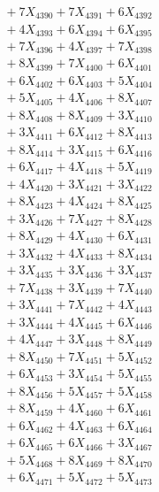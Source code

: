\documentclass[a4paper,10pt]{article}
\begin{document}
{\begin{align}
&\;  + 7 X_{4390} + 7 X_{4391} + 6 X_{4392} \\[0.3ex]
&\;  + 4 X_{4393} + 6 X_{4394} + 6 X_{4395} \\[0.3ex]
&\;  + 7 X_{4396} + 4 X_{4397} + 7 X_{4398} \\[0.3ex]
&\;  + 8 X_{4399} + 7 X_{4400} + 6 X_{4401} \\[0.3ex]
&\;  + 6 X_{4402} + 6 X_{4403} + 5 X_{4404} \\[0.3ex]
&\;  + 5 X_{4405} + 4 X_{4406} + 8 X_{4407} \\[0.3ex]
&\;  + 8 X_{4408} + 8 X_{4409} + 3 X_{4410} \\[0.3ex]
&\;  + 3 X_{4411} + 6 X_{4412} + 8 X_{4413} \\[0.3ex]
&\;  + 8 X_{4414} + 3 X_{4415} + 6 X_{4416} \\[0.3ex]
&\;  + 6 X_{4417} + 4 X_{4418} + 5 X_{4419} \\[0.5ex]\allowbreak
&\;  + 4 X_{4420} + 3 X_{4421} + 3 X_{4422} \\[0.3ex]
&\;  + 8 X_{4423} + 4 X_{4424} + 8 X_{4425} \\[0.3ex]
&\;  + 3 X_{4426} + 7 X_{4427} + 8 X_{4428} \\[0.3ex]
&\;  + 8 X_{4429} + 4 X_{4430} + 6 X_{4431} \\[0.3ex]
&\;  + 3 X_{4432} + 4 X_{4433} + 8 X_{4434} \\[0.3ex]
&\;  + 3 X_{4435} + 3 X_{4436} + 3 X_{4437} \\[0.3ex]
&\;  + 7 X_{4438} + 3 X_{4439} + 7 X_{4440} \\[0.3ex]
&\;  + 3 X_{4441} + 7 X_{4442} + 4 X_{4443} \\[0.3ex]
&\;  + 3 X_{4444} + 4 X_{4445} + 6 X_{4446} \\[0.3ex]
&\;  + 4 X_{4447} + 3 X_{4448} + 8 X_{4449} \\[0.5ex]\allowbreak
&\;  + 8 X_{4450} + 7 X_{4451} + 5 X_{4452} \\[0.3ex]
&\;  + 6 X_{4453} + 3 X_{4454} + 5 X_{4455} \\[0.3ex]
&\;  + 8 X_{4456} + 5 X_{4457} + 5 X_{4458} \\[0.3ex]
&\;  + 8 X_{4459} + 4 X_{4460} + 6 X_{4461} \\[0.3ex]
&\;  + 6 X_{4462} + 4 X_{4463} + 6 X_{4464} \\[0.3ex]
&\;  + 6 X_{4465} + 6 X_{4466} + 3 X_{4467} \\[0.3ex]
&\;  + 5 X_{4468} + 8 X_{4469} + 8 X_{4470} \\[0.3ex]
&\;  + 6 X_{4471} + 5 X_{4472} + 5 X_{4473} \\[0.3ex]

\end{align}}
\end{document}
